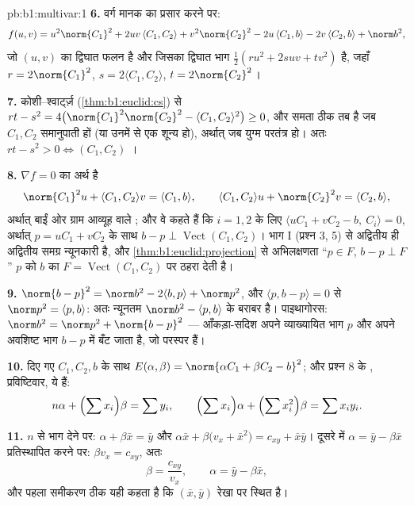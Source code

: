 \begin{solution}{pb:b1:multivar:1}
\textbf{6.} वर्ग मानक का प्रसार करने पर:
\[
f(u,v) = u^2\norm{C_1}^2 + 2uv\,\langle C_1, C_2\rangle +
v^2\norm{C_2}^2 - 2u\,\langle C_1, b\rangle - 2v\,\langle C_2,
b\rangle + \norm b^2 ,
\]
जो $(u, v)$ का द्विघात फलन है और जिसका द्विघात भाग $\frac12(ru^2 + 2suv +
tv^2)$ है, जहाँ $r = 2\norm{C_1}^2$, $s = 2\langle C_1, C_2\rangle$, $t =
2\norm{C_2}^2$।

\textbf{7.} कोशी--श्वार्ट्ज़ (\cref{thm:b1:euclid:cs}) से $rt - s^2 =
4\bigl(\norm{C_1}^2\norm{C_2}^2 - \langle C_1, C_2\rangle^2\bigr) \geq 0$,
और समता ठीक तब है जब $C_1, C_2$ समानुपाती हों (या उनमें से एक शून्य हो),
अर्थात् जब युग्म परतंत्र हो। अतः $rt - s^2 > 0 \iff (C_1, C_2)$ ।

\textbf{8.} $\nabla f = 0$ का अर्थ है
\[
\norm{C_1}^2 u + \langle C_1, C_2\rangle v = \langle C_1,
b\rangle,
\qquad
\langle C_1, C_2\rangle u + \norm{C_2}^2 v = \langle C_2,
b\rangle,
\]
अर्थात् बाईं ओर ग्राम आव्यूह वाले ; और वे कहते हैं कि $i
= 1, 2$ के लिए $\langle uC_1 + vC_2 - b,\ C_i\rangle = 0$, अर्थात् $p =
uC_1 + vC_2$ के साथ $b - p \perp \operatorname{Vect}(C_1, C_2)$। भाग I
(प्रश्न 3, 5) से अद्वितीय  ही अद्वितीय समग्र न्यूनकारी है,
और \cref{thm:b1:euclid:projection} से अभिलक्षणता ``$p \in F$, $b - p \perp
F$'' $p$ को $b$ का $F = \operatorname{Vect}(C_1, C_2)$ पर 
ठहरा देती है।

\textbf{9.} $\norm{b - p}^2 = \norm b^2 - 2\langle b, p\rangle + \norm
p^2$, और $\langle p, b - p\rangle = 0$ से $\norm p^2 = \langle p,
b\rangle$: अतः न्यूनतम $\norm b^2 - \langle p, b\rangle$ के बराबर है।
पाइथागोरस: $\norm b^2 = \norm p^2 + \norm{b - p}^2$ --- आँकड़ा-सदिश अपने
व्याख्यायित भाग $p$ और अपने अवशिष्ट भाग $b - p$ में बँट जाता है, जो परस्पर
 हैं।

\textbf{10.} दिए गए $C_1, C_2, b$ के साथ $E(\alpha, \beta) = \norm{\alpha
C_1 + \beta C_2 - b}^2$; और प्रश्न 8 के , प्रविष्टिवार,
ये हैं:
\[
n\alpha + \Bigl(\sum x_i\Bigr)\beta = \sum y_i,
\qquad
\Bigl(\sum x_i\Bigr)\alpha + \Bigl(\sum x_i^2\Bigr)\beta = \sum
x_i y_i .
\]

\textbf{11.} $n$ से भाग देने पर: $\alpha + \beta\bar x = \bar y$ और
$\alpha\bar x + \beta\bigl(v_x + \bar x^2\bigr) = c_{xy} + \bar x\bar y$।
दूसरे में $\alpha = \bar y - \beta\bar x$ प्रतिस्थापित करने पर: $\beta v_x
= c_{xy}$, अतः
\[
\beta = \frac{c_{xy}}{v_x}, \qquad \alpha = \bar y - \beta\bar
x ,
\]
और पहला समीकरण ठीक यही कहता है कि $(\bar x, \bar y)$ रेखा पर स्थित है।


\end{solution}
